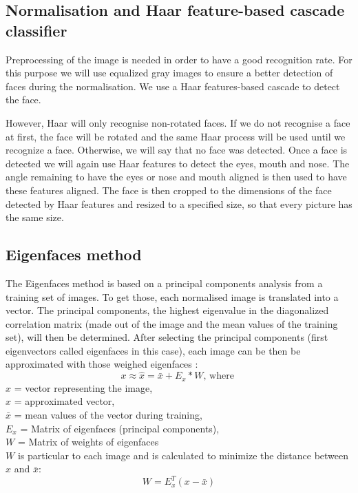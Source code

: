 \subsection{Normalisation and Haar feature-based cascade classifier}
Preprocessing of the image is needed in order to have a good recognition rate. For this purpose we will use equalized gray images to ensure a better detection of faces during the normalisation. We use a Haar features-based cascade to detect the face.

However, Haar will only recognise non-rotated faces. If we do not recognise a face at first, the face will be rotated and the same Haar process will be used until we recognize a face. Otherwise, we will say that no face was detected. Once a face is detected we will again use Haar features to detect the eyes, mouth and nose. The angle remaining to have the eyes or nose and mouth aligned is then used to have these features aligned. The face is then cropped to the dimensions of the face detected by Haar features and resized to a specified size, so that every picture has the same size.

\subsection{Eigenfaces method}

The Eigenfaces method is based on a principal components analysis from a training set of images. To get those, each normalised image is translated into a vector. The principal components, the highest eigenvalue in the diagonalized correlation matrix (made out of the image and the mean values of the training set), will then be determined. After selecting the principal components (first eigenvectors called eigenfaces in this case), each image can be then be approximated with those weighed eigenfaces :
\begin{equation}
x \approx  \hat{x} = \bar{x} + E_{x} * W \textrm{, where } 
\end{equation}
$x$ = vector representing the image,\\
$\hat{x}$ = approximated vector,\\
$\bar{x}$ = mean values of the vector during training,\\
$E_{x}$ = Matrix of eigenfaces (principal components),\\
$W$ = Matrix of weights of eigenfaces\\

$W$ is particular to each image and is calculated to minimize the distance between $x$ and $\bar{x}$:
\begin{equation}
W = E_{x}^T (x-\bar{x}) 
\end{equation}

